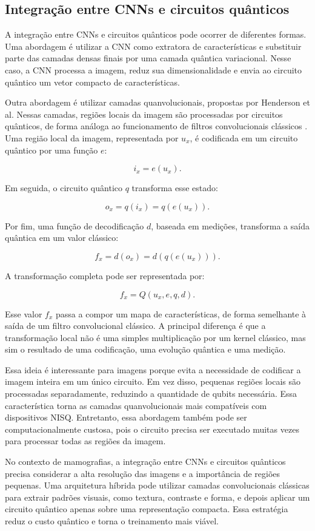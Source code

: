 \documentclass[
    12pt,
    openright,
    oneside,
    a4paper,
    english,
    brazil
]{abntex2}
\begin{document}
\subsection{Integração entre CNNs e circuitos quânticos}

A integração entre CNNs e circuitos quânticos pode ocorrer de diferentes formas. Uma abordagem é utilizar a CNN como extratora de características e substituir parte das camadas densas finais por uma camada quântica variacional. Nesse caso, a CNN processa a imagem, reduz sua dimensionalidade e envia ao circuito quântico um vetor compacto de características.

Outra abordagem é utilizar camadas quanvolucionais, propostas por Henderson et al. Nessas camadas, regiões locais da imagem são processadas por circuitos quânticos, de forma análoga ao funcionamento de filtros convolucionais clássicos \cite{henderson2020quanvolutional}. Uma região local da imagem, representada por \(u_x\), é codificada em um circuito quântico por uma função \(e\):

\[
i_x = e(u_x).
\]

Em seguida, o circuito quântico \(q\) transforma esse estado:

\[
o_x = q(i_x) = q(e(u_x)).
\]

Por fim, uma função de decodificação \(d\), baseada em medições, transforma a saída quântica em um valor clássico:

\[
f_x = d(o_x) = d(q(e(u_x))).
\]

A transformação completa pode ser representada por:

\[
f_x = Q(u_x, e, q, d).
\]

Esse valor \(f_x\) passa a compor um mapa de características, de forma semelhante à saída de um filtro convolucional clássico. A principal diferença é que a transformação local não é uma simples multiplicação por um kernel clássico, mas sim o resultado de uma codificação, uma evolução quântica e uma medição.

Essa ideia é interessante para imagens porque evita a necessidade de codificar a imagem inteira em um único circuito. Em vez disso, pequenas regiões locais são processadas separadamente, reduzindo a quantidade de qubits necessária. Essa característica torna as camadas quanvolucionais mais compatíveis com dispositivos NISQ. Entretanto, essa abordagem também pode ser computacionalmente custosa, pois o circuito precisa ser executado muitas vezes para processar todas as regiões da imagem.

No contexto de mamografias, a integração entre CNNs e circuitos quânticos precisa considerar a alta resolução das imagens e a importância de regiões pequenas. Uma arquitetura híbrida pode utilizar camadas convolucionais clássicas para extrair padrões visuais, como textura, contraste e forma, e depois aplicar um circuito quântico apenas sobre uma representação compacta. Essa estratégia reduz o custo quântico e torna o treinamento mais viável.
\end{document}
